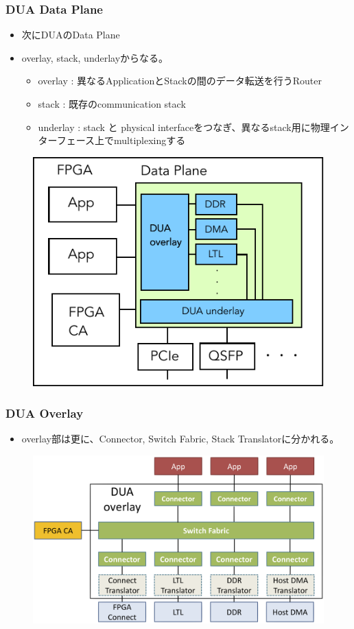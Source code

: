 \documentclass[dvipdfmx,9pt,notheorems]{beamer}
\theoremstyle{definition}
\begin{document}
\begin{frame}\frametitle{DUA Data Plane}
	\begin{itemize}
		\item 次にDUAのData Plane
		\item overlay, stack, underlayからなる。
			\begin{itemize}
				\item overlay  : 異なるApplicationとStackの間のデータ転送を行うRouter
				\item stack    : 既存のcommunication stack
				\item underlay : stack と physical interfaceをつなぎ、異なるstack用に物理インターフェース上でmultiplexingする
			\end{itemize}
	\end{itemize}
  \begin{figure}[htb]
		\includegraphics[scale=0.5]{fig/ez_DUA_DataPlane.pdf}
  \end{figure}
\pnote{
}
\end{frame}


\begin{frame}\frametitle{DUA Overlay}
	\begin{itemize}
		\item overlay部は更に、Connector, Switch Fabric, Stack Translatorに分かれる。
	\end{itemize}
  \begin{figure}[htb]
		\includegraphics[scale=1.0]{fig/figure6.png}
  \end{figure}
\end{frame}
\end{document}
